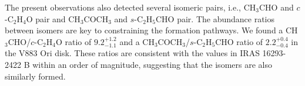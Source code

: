 \documentclass[linenumbers, twocolumn, twocolappendix, astrosymb, times]{aastex631}
\newcommand{\methanol}{CH$_3$OH\xspace}
\newcommand{\acetaldehyde}{CH$_3$CHO\xspace}
\newcommand{\methylformate}{CH$_3$OCHO\xspace}
\newcommand{\acetone}{CH$_3$COCH$_3$\xspace}
\newcommand{\ethyleneoxide}{$c$-C$_2$H$_4$O\xspace}
\newcommand{\propenal}{$t$-C$_2$H$_3$CHO\xspace}
\newcommand{\propanal}{$s$-C$_2$H$_5$CHO\xspace}
\begin{document}
The present observations also detected several isomeric pairs, i.e., \acetaldehyde and \ethyleneoxide pair and \acetone and \propanal pair. The abundance ratios between isomers are key to constraining the formation pathways. We found a \acetaldehyde/\ethyleneoxide ratio of $9.2_{-1.1}^{+1.2}$ and a \acetone/\propanal ratio of $2.2_{-0.4}^{+0.4}$ in the V883 Ori disk. These ratios are consistent with the values in IRAS 16293-2422 B \citep{Lykke2017} within an order of magnitude, suggesting that the isomers are also similarly formed.  




\end{document}
